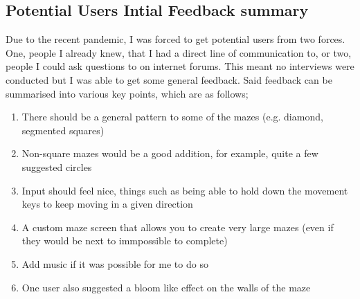 \documentclass{article}
\begin{document}
\subsection{Potential Users Intial Feedback summary}
Due to the recent pandemic, I was forced to get potential users from two forces. One, people I already knew, that I had a direct line of communication to, or two, people I could ask questions to on internet forums. This meant no interviews were conducted but I was able to get some general feedback. Said feedback can be summarised into various key points, which are as follows;
\begin{enumerate}
	\item There should be a general pattern to some of the mazes (e.g. diamond, segmented squares)
	\item Non-square mazes would be a good addition, for example, quite a few suggested circles
	\item Input should feel nice, things such as being able to hold down the movement keys to keep moving in a given direction
	\item A custom maze screen that allows you to create very large mazes (even if they would be next to immpossible to complete)
	\item Add music if it was possible for me to do so
	\item One user also suggested a bloom like effect on the walls of the maze
\end{enumerate}

\clearpage
\end{document}
